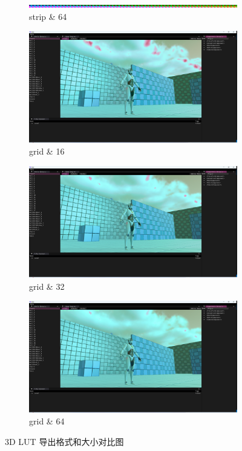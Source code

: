 \documentclass{ctexart}
\begin{document}
\begin{figure}[!htbp]
\begin{subfigure}{0.3\textwidth}
    		\includegraphics[width=\textwidth]{cube_strip_2d_64_avatar.png}
    		\caption{strip \& 64}
    	\end{subfigure}
    	\begin{subfigure}{0.3\textwidth}
    		\includegraphics[width=\textwidth]{screen_shot_cube_grid_2d_16_avatar.png}
    		\caption{grid \& 16}
    	\end{subfigure}
    	\begin{subfigure}{0.3\textwidth}
    		\includegraphics[width=\textwidth]{screen_shot_cube_grid_2d_32_avatar.png}
    		\caption{grid \& 32}
    	\end{subfigure}
    	\begin{subfigure}{0.3\textwidth}
    		\includegraphics[width=\textwidth]{screen_shot_cube_grid_2d_64_avatar.png}
    		\caption{grid \& 64}
    	\end{subfigure} 
    	\caption{3D LUT 导出格式和大小对比图}
    \end{figure}
    
\end{document}
